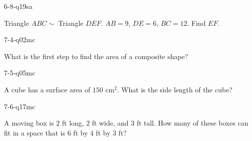 \begin{practiceQuestion}{6-8-q19}{sa}
\begin{questionText}
Triangle $ABC \sim$ Triangle $DEF$. $AB = 9$, $DE = 6$, $BC = 12$. Find $EF$.
\end{questionText}
\end{practiceQuestion}

\begin{practiceQuestion}{7-4-q02}{mc}
\begin{questionText}
What is the first step to find the area of a composite shape?
\end{questionText}
\end{practiceQuestion}

\begin{practiceQuestion}{7-5-q05}{mc}
\begin{questionText}
A cube has a surface area of $150$ cm$^2$. What is the side length of the cube?
\end{questionText}
\end{practiceQuestion}

\begin{practiceQuestion}{7-6-q17}{mc}
\begin{questionText}
A moving box is $2$ ft long, $2$ ft wide, and $3$ ft tall. How many of these boxes can fit in a space that is $6$ ft by $4$ ft by $3$ ft?
\end{questionText}
\end{practiceQuestion}

